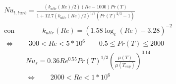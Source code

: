 \documentclass[a4paper,10pt]{article}                                                                                       %
\begin{document}
\begin{equation}                                                                                                            %
  \begin{aligned}                                                                                                           %
  Nu_{t,turb} = \frac{(k_{attr}(Re)/2)(Re-1000)Pr(T)}{1+12.7(k_{attr}(Re)/2)^{1/2}(Pr(T)^{2/3}-1)}                          %
  \\\text{con}\qquad\qquad                                                                                                  %
  k_{attr}(Re) = \left(1.58\log_e{(Re)}-3.28\right)^{-2}                                                                    %
  \\\Leftrightarrow\qquad                                                                                                   %
  300<Re<5*10^6\qquad0.5\le Pr(T)\le2000                                                                                    %
  \label{eqn:nu_pipe_t}                                                                                                     %
  \end{aligned}                                                                                                             %
\end{equation}                                                                                                              %
\vspace{3mm}                                                                                                                %
\begin{equation}                                                                                                            %
  \begin{aligned}                                                                                                           %
  Nu_s = 0.36Re^{0.55}Pr(T)^{1/3}\left(\frac{\mu(T)}{\mu(T_{sup})}\right)^{0.14}                                            %
  \\\Leftrightarrow\qquad                                                                                                   %
  2000<Re<1*10^6\qquad\qquad                                                                                                %
  \label{eqn:nu_shell}                                                                                                      %
  \end{aligned}                                                                                                             %
\end{equation}                                                                                                              %
\end{document}
